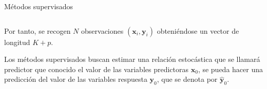 \begin{frame}{Métodos supervisados}
\begin{columns}
\begin{column}{0.9\textwidth}
Por tanto, se recogen $N$ observaciones $(\mathbf{x}_i,\mathbf{y}_i)$ obteniéndose un vector de longitud $K+p$.

Los métodos supervisados buscan estimar una relación estocástica que se llamará predictor que conocido el valor de las variables predictoras $\mathbf{x}_0$, se pueda hacer una predicción del valor de las variables respuesta $\mathbf{y}_0$, que se denota por $\mathbf{\hat{y}}_0$.
\end{column}
\end{columns}
\end{frame}








